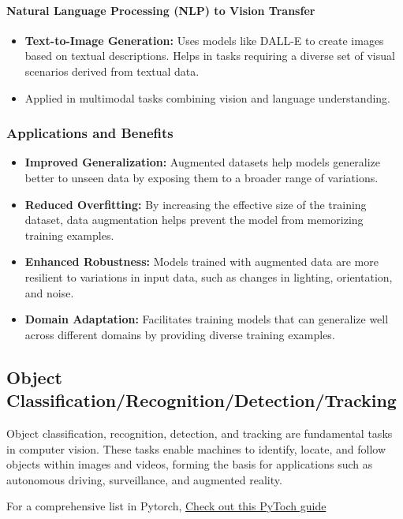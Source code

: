 \documentclass[12pt]{article}
\begin{document}
\paragraph{Natural Language Processing (NLP) to Vision Transfer}
\begin{itemize}
    \item \textbf{Text-to-Image Generation:} Uses models like DALL-E to create images based on textual descriptions. Helps in tasks requiring a diverse set of visual scenarios derived from textual data.
    \item Applied in multimodal tasks combining vision and language understanding.
\end{itemize}

\subsubsection{Applications and Benefits}

\begin{itemize}
    \item \textbf{Improved Generalization:} Augmented datasets help models generalize better to unseen data by exposing them to a broader range of variations.
    \item \textbf{Reduced Overfitting:} By increasing the effective size of the training dataset, data augmentation helps prevent the model from memorizing training examples.
    \item \textbf{Enhanced Robustness:} Models trained with augmented data are more resilient to variations in input data, such as changes in lighting, orientation, and noise.
    \item \textbf{Domain Adaptation:} Facilitates training models that can generalize well across different domains by providing diverse training examples.
\end{itemize}

\subsection{Object Classification/Recognition/Detection/Tracking}

Object classification, recognition, detection, and tracking are fundamental tasks in computer vision. These tasks enable machines to identify, locate, and follow objects within images and videos, forming the basis for applications such as autonomous driving, surveillance, and augmented reality.

For a comprehensive list in Pytorch, \href{https://pytorch.org/vision/main/auto_examples/transforms/plot_transforms_illustrations.html#sphx-glr-auto-examples-transforms-plot-transforms-illustrations-py}{Check out this PyToch guide}
\end{document}
